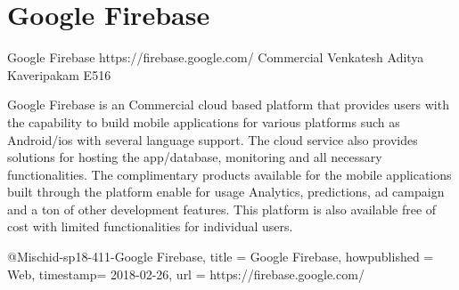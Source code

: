 \section{Google Firebase}

Google Firebase
https://firebase.google.com/
Commercial
Venkatesh Aditya Kaveripakam
E516

Google Firebase is an Commercial cloud based platform that provides users with
the capability to build mobile applications for various platforms such as
Android/ios with several language support. The cloud service also provides
solutions for hosting the app/database, monitoring and all necessary
functionalities. The complimentary products available for the mobile
applications built through the platform enable for usage Analytics, predictions,
 ad campaign and a ton of other development features. This platform is also
 available free of cost with limited functionalities for individual users.

@Misc{hid-sp18-411-Google Firebase,
title = {Google Firebase},
howpublished = {Web},
timestamp= {2018-02-26},
url = {https://firebase.google.com/}
}